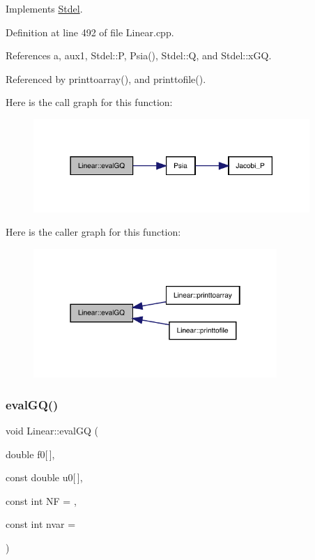 Implements \hyperlink{classStdel_aac725224c4c3433228ca6841fe7aba49}{Stdel}.



Definition at line 492 of file Linear.\+cpp.



References a, aux1, Stdel\+::P, Psia(), Stdel\+::Q, and Stdel\+::x\+GQ.



Referenced by printtoarray(), and printtofile().

Here is the call graph for this function\+:
\nopagebreak
\begin{figure}[H]
\begin{center}
\leavevmode
\includegraphics[width=297pt]{classLinear_af9e2cd53ea3067ab074a735ef7df33e7_cgraph}
\end{center}
\end{figure}
Here is the caller graph for this function\+:
\nopagebreak
\begin{figure}[H]
\begin{center}
\leavevmode
\includegraphics[width=262pt]{classLinear_af9e2cd53ea3067ab074a735ef7df33e7_icgraph}
\end{center}
\end{figure}
\mbox{\label{classLinear_a6b7d2f6ffb9cef8e9f6a6f2a8365db60}} 
\subsubsection{\texorpdfstring{eval\+G\+Q()}{evalGQ()}\hspace{0.1cm}{\footnotesize\ttfamily [2/2]}}
{\footnotesize\ttfamily void Linear\+::eval\+GQ (\begin{DoxyParamCaption}\item[{double}]{f0\mbox{[}$\,$\mbox{]},  }\item[{const double}]{u0\mbox{[}$\,$\mbox{]},  }\item[{const int}]{NF = {},  }\item[{const int}]{nvar = {} }\end{DoxyParamCaption})\hspace{0.3cm}{\ttfamily [virtual]}}



